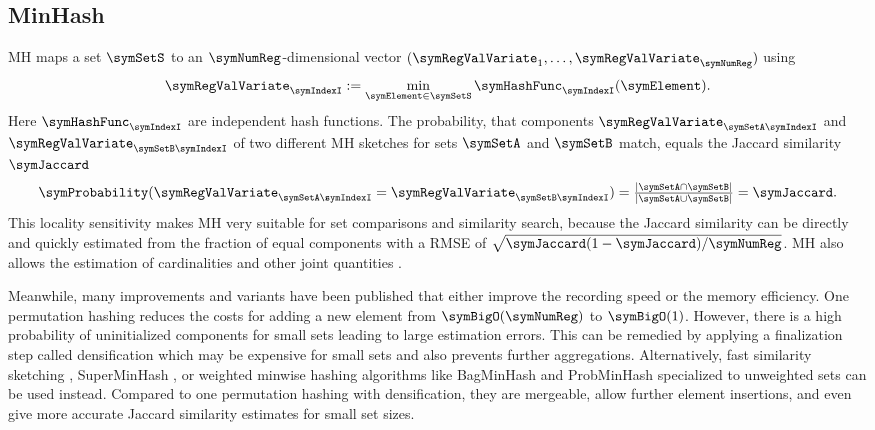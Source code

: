\documentclass[sigconf, nonacm]{acmart}
\begin{document}
\subsection{MinHash}
\Ac{MH} \cite{Broder1997} maps a set $\symSetS$ to an $\symNumReg$-dimensional vector $(\symRegValVariate_1, \ldots,\symRegValVariate_\symNumReg)$ using
\begin{equation*}
\symRegValVariate_\symIndexI := \min_{\symElement\in\symSetS} \symHashFunc_\symIndexI(\symElement).
\end{equation*}
Here $\symHashFunc_\symIndexI$ are independent hash functions. The probability, that components $\symRegValVariate_{\symSetA\symIndexI}$ and $\symRegValVariate_{\symSetB\symIndexI}$ of two different \ac{MH} sketches for sets $\symSetA$ and $\symSetB$ match, equals the Jaccard similarity $\symJaccard$
\begin{equation*}
\symProbability(\symRegValVariate_{\symSetA\symIndexI} = \symRegValVariate_{\symSetB\symIndexI}) = {\textstyle\frac{|\symSetA \cap \symSetB|}{|\symSetA \cup \symSetB|}} = \symJaccard.
\end{equation*}
This locality sensitivity makes \ac{MH} very suitable for set comparisons and similarity search, because the Jaccard similarity can be directly and quickly estimated from the fraction of equal components with a \ac{RMSE} of $\sqrt{\symJaccard(1-\symJaccard)/\symNumReg}$. \ac{MH} also allows the estimation of cardinalities \cite{Clifford2012, Cohen2015} and other joint quantities \cite{Dasu2002, Cohen2017}.
 
Meanwhile, many improvements and variants have been published that either improve the recording speed or the memory efficiency. One permutation hashing \cite{Li2012} reduces the costs for adding a new element from $\symBigO(\symNumReg)$ to $\symBigO(1)$. However, there is a high probability of uninitialized components for small sets leading to large estimation errors. This can be remedied by applying a finalization step called densification \cite{Shrivastava2014, Shrivastava2017, Mai2019} which may be expensive for small sets \cite{Ertl2020} and also prevents further aggregations. Alternatively, fast similarity sketching \cite{Dahlgaard2017}, SuperMinHash \cite{Ertl2017b}, or weighted minwise hashing algorithms like BagMinHash \cite{Ertl2018} and ProbMinHash \cite{Ertl2020} specialized to unweighted sets  can be used instead. Compared to one permutation hashing with densification, they are mergeable, allow further element insertions, and even give more accurate Jaccard similarity estimates for small set sizes.
\end{document}
